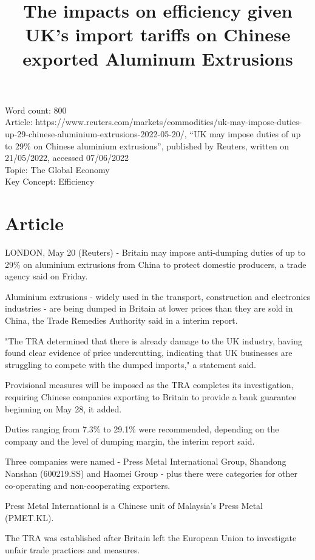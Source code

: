 \documentclass[a4paper,12pt]{article}
\title{The impacts on efficiency given UK's import tariffs on Chinese exported Aluminum Extrusions}
\author{\vspace{-8ex}}
\date{\vspace{-8ex}}
\newcommand{\initTexcount}[1]{\immediate\write18{texcount -inc -incbib
		-sum #1 > .wordcount.tex}}
\newcommand\wordcount{
		}
\begin{document}
\maketitle
Word count: 800\\
Article: https://www.reuters.com/markets/commodities/uk-may-impose-duties-up-29-chinese-aluminium-extrusions-2022-05-20/, ``UK may impose duties of up to 29\% on Chinese aluminium extrusions'', published by Reuters, written on 21/05/2022, accessed 07/06/2022\\
Topic: The Global Economy\\
Key Concept: Efficiency


\newpage
\section*{Article}
LONDON, May 20 (Reuters) - Britain may impose anti-dumping duties of up to 29\% on aluminium extrusions from China to protect domestic producers, a trade agency said on Friday.

Aluminium extrusions - widely used in the transport, construction and electronics industries - are being dumped in Britain at lower prices than they are sold in China, the Trade Remedies Authority said in a interim report.

"The TRA determined that there is already damage to the UK industry, having found clear evidence of price undercutting, indicating that UK businesses are struggling to compete with the dumped imports," a statement said.

Provisional measures will be imposed as the TRA completes its investigation, requiring Chinese companies exporting to Britain to provide a bank guarantee beginning on May 28, it added.

Duties ranging from 7.3\% to 29.1\% were recommended, depending on the company and the level of dumping margin, the interim report said.

Three companies were named - Press Metal International Group, Shandong Nanshan (600219.SS) and Haomei Group - plus there were categories for other co-operating and non-cooperating exporters.

Press Metal International is a Chinese unit of Malaysia's Press Metal (PMET.KL).

The TRA was established after Britain left the European Union to investigate unfair trade practices and measures.
\end{document}
